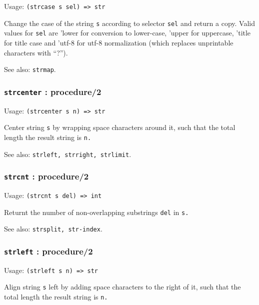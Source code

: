 \documentclass[
]{article}
\newcommand{\passthrough}[1]{#1}
\begin{document}
Usage: \passthrough{\lstinline!(strcase s sel) => str!}

Change the case of the string \passthrough{\lstinline!s!} according to
selector \passthrough{\lstinline!sel!} and return a copy. Valid values
for \passthrough{\lstinline!sel!} are 'lower for conversion to
lower-case, 'upper for uppercase, 'title for title case and 'utf-8 for
utf-8 normalization (which replaces unprintable characters with ``?'').

See also: \passthrough{\lstinline!strmap!}.

\hypertarget{strcenter-procedure2}{%
\subsubsection{\texorpdfstring{\texttt{strcenter} :
procedure/2}{strcenter : procedure/2}}\label{strcenter-procedure2}}

Usage: \passthrough{\lstinline!(strcenter s n) => str!}

Center string \passthrough{\lstinline!s!} by wrapping space characters
around it, such that the total length the result string is
\passthrough{\lstinline!n.!}

See also: \passthrough{\lstinline!strleft, strright, strlimit!}.

\hypertarget{strcnt-procedure2}{%
\subsubsection{\texorpdfstring{\texttt{strcnt} :
procedure/2}{strcnt : procedure/2}}\label{strcnt-procedure2}}

Usage: \passthrough{\lstinline!(strcnt s del) => int!}

Returnt the number of non-overlapping substrings
\passthrough{\lstinline!del!} in \passthrough{\lstinline!s.!}

See also: \passthrough{\lstinline!strsplit, str-index!}.

\hypertarget{strleft-procedure2}{%
\subsubsection{\texorpdfstring{\texttt{strleft} :
procedure/2}{strleft : procedure/2}}\label{strleft-procedure2}}

Usage: \passthrough{\lstinline!(strleft s n) => str!}

Align string \passthrough{\lstinline!s!} left by adding space characters
to the right of it, such that the total length the result string is
\passthrough{\lstinline!n.!}
\end{document}
